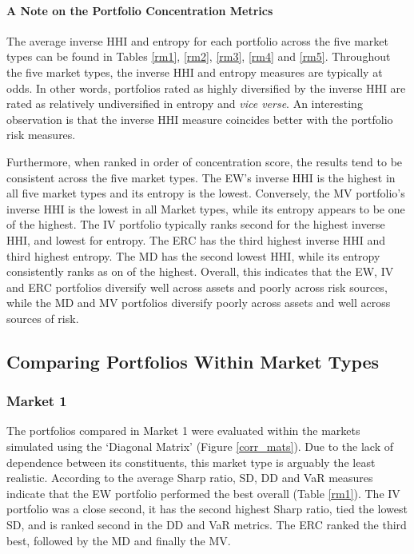 \documentclass[11pt,preprint, authoryear]{elsarticle}
\numberwithin{equation}{section}
\numberwithin{figure}{section}
\numberwithin{table}{section}
\begin{document}
\hypertarget{a-note-on-the-portfolio-concentration-metrics}{%
\paragraph{\texorpdfstring{A Note on the Portfolio Concentration Metrics
\label{cn}}{A Note on the Portfolio Concentration Metrics }}\label{a-note-on-the-portfolio-concentration-metrics}}

The average inverse HHI and entropy for each portfolio across the five
market types can be found in Tables \ref{rm1}, \ref{rm2}, \ref{rm3},
\ref{rm4} and \ref{rm5}. Throughout the five market types, the inverse
HHI and entropy measures are typically at odds. In other words,
portfolios rated as highly diversified by the inverse HHI are rated as
relatively undiversified in entropy and \emph{vice verse}. An
interesting observation is that the inverse HHI measure coincides better
with the portfolio risk measures.

Furthermore, when ranked in order of concentration score, the results
tend to be consistent across the five market types. The EW's inverse HHI
is the highest in all five market types and its entropy is the lowest.
Conversely, the MV portfolio's inverse HHI is the lowest in all Market
types, while its entropy appears to be one of the highest. The IV
portfolio typically ranks second for the highest inverse HHI, and lowest
for entropy. The ERC has the third highest inverse HHI and third highest
entropy. The MD has the second lowest HHI, while its entropy
consistently ranks as on of the highest. Overall, this indicates that
the EW, IV and ERC portfolios diversify well across assets and poorly
across risk sources, while the MD and MV portfolios diversify poorly
across assets and well across sources of risk.

\hypertarget{comparing-portfolios-within-market-types}{%
\subsection{\texorpdfstring{Comparing Portfolios Within Market Types
\label{within-market}}{Comparing Portfolios Within Market Types }}\label{comparing-portfolios-within-market-types}}

\hypertarget{market-1}{%
\subsubsection{Market 1}\label{market-1}}

The portfolios compared in Market 1 were evaluated within the markets
simulated using the `Diagonal Matrix' (Figure \ref{corr_mats}). Due to
the lack of dependence between its constituents, this market type is
arguably the least realistic. According to the average Sharp ratio, SD,
DD and VaR measures indicate that the EW portfolio performed the best
overall (Table \ref{rm1}). The IV portfolio was a close second, it has
the second highest Sharp ratio, tied the lowest SD, and is ranked second
in the DD and VaR metrics. The ERC ranked the third best, followed by
the MD and finally the MV.
\end{document}
